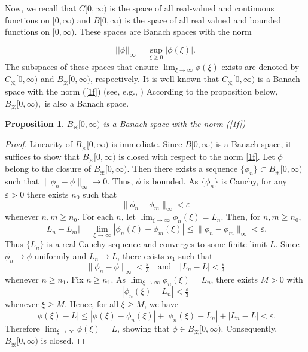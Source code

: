 \documentclass{amsart}
\theoremstyle{plain}
\newtheorem{proposition}{Proposition}
\numberwithin{equation}{section}
\begin{document}
Now, we recall that $C[0,\infty)$ is the space of all real-valued and
continuous functions on $[0,\infty)$ and $B[0,\infty)$ is the space of all
real valued and bounded functions on $[0,\infty)$. These spaces are Banach
spaces with the norm

\begin{equation}
||\phi||_{\infty}=\sup_{\xi \ge 0}|\phi(\xi)|.\label{1f}%
\end{equation}
The subspaces of these spaces that ensure $\displaystyle\lim_{\xi \rightarrow \infty}\phi(\xi)$ exists
are denoted by $C_{\divideontimes}[0,\infty)$ and $B_{\divideontimes}[0,\infty)$,
respectively. It is well known that $C_{\divideontimes}[0,\infty)$ is a Banach space with the norm (\ref{1f}) (see, e.g., \cite{holhos, holhos2018}) According to the proposition below, $B_{\divideontimes}[0,\infty),$ is also a Banach space.

\begin{proposition}
\label{pro1}$B_{\divideontimes}[0,\infty)$ is a Banach space with the norm
(\ref{1f})
\end{proposition}

\begin{proof}
Linearity of $B_{\divideontimes}[0,\infty)$ is immediate. Since $B[0,\infty)$
is a Banach space, it suffices to show that $B_{\divideontimes}[0,\infty)$ is
closed with respect to the norm \eqref{1f}. Let $\phi$ belong to the closure of
$B_{\divideontimes}[0,\infty)$. Then there exists a sequence
$\{\phi_{n}\}\subset B_{\divideontimes}[0,\infty)$ such that
$\|\phi_{n}-\phi\|_{\infty}\to 0$. Thus, $\phi$ is bounded. As $\{\phi_{n}\}$ is Cauchy, for any $\varepsilon>0$ there exists $n_{0}$ such that
\[
\|\phi_{n}-\phi_{m}\|_{\infty}<\varepsilon
\]
whenever  $n,m\geq n_{0}$. For each $n$, let $\displaystyle\lim_{\xi\to\infty}\phi_{n}(\xi)=L_{n}$. Then, for $n,m\geq n_{0}$,
\[
|L_{n}-L_{m}|=\lim_{\xi\to\infty}|\phi_{n}(\xi)-\phi_{m}(\xi)|
   \leq \|\phi_{n}-\phi_{m}\|_{\infty}<\varepsilon.
\]
Thus $\{L_{n}\}$ is a  real Cauchy sequence and converges to some
finite limit $L$. Since $\phi_{n}\to\phi$ uniformly and $L_{n}\to L$, there exists $n_{1}$ such that
\[
\|\phi_{n}-\phi\|_{\infty}<\tfrac{\varepsilon}{3}
\quad\text{and}\quad
|L_{n}-L|<\tfrac{\varepsilon}{3}
\]
whenever $n\geq n_{1}$.
Fix $n\geq n_{1}$. As $\displaystyle\lim_{\xi\to\infty}\phi_{n}(\xi)=L_{n}$, there exists $M>0$ with
\[
|\phi_{n}(\xi)-L_{n}|<\tfrac{\varepsilon}{3} 
\]
whenever $\xi\geq M$.
Hence, for all $\xi\geq M$, we have
\[
|\phi(\xi)-L|
  \leq |\phi(\xi)-\phi_{n}(\xi)| + |\phi_{n}(\xi)-L_{n}| + |L_{n}-L|
  < \varepsilon.
\]
Therefore $\lim_{\xi\to\infty}\phi(\xi)=L$, showing that
$\phi\in B_{\divideontimes}[0,\infty)$. Consequently,
$B_{\divideontimes}[0,\infty)$ is closed.
\end{proof}
\end{document}
